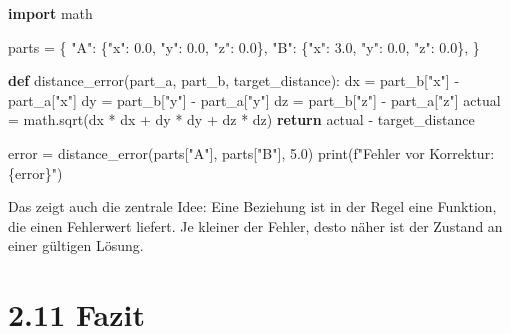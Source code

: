 \documentclass[
  12pt
]{book}
\newenvironment{Shaded}{}{}
\newcommand{\BuiltInTok}[1]{\textcolor[rgb]{0.00,0.50,0.00}{#1}}
\newcommand{\ControlFlowTok}[1]{\textcolor[rgb]{0.00,0.44,0.13}{\textbf{#1}}}
\newcommand{\FloatTok}[1]{\textcolor[rgb]{0.25,0.63,0.44}{#1}}
\newcommand{\ImportTok}[1]{\textcolor[rgb]{0.00,0.50,0.00}{\textbf{#1}}}
\newcommand{\KeywordTok}[1]{\textcolor[rgb]{0.00,0.44,0.13}{\textbf{#1}}}
\newcommand{\NormalTok}[1]{#1}
\newcommand{\OperatorTok}[1]{\textcolor[rgb]{0.40,0.40,0.40}{#1}}
\newcommand{\SpecialCharTok}[1]{\textcolor[rgb]{0.25,0.44,0.63}{#1}}
\newcommand{\SpecialStringTok}[1]{\textcolor[rgb]{0.73,0.40,0.53}{#1}}
\newcommand{\StringTok}[1]{\textcolor[rgb]{0.25,0.44,0.63}{#1}}
\begin{document}
\begin{Shaded}
\begin{Highlighting}[]
\ImportTok{import}\NormalTok{ math}

\NormalTok{parts }\OperatorTok{=}\NormalTok{ \{}
    \StringTok{"A"}\NormalTok{: \{}\StringTok{"x"}\NormalTok{: }\FloatTok{0.0}\NormalTok{, }\StringTok{"y"}\NormalTok{: }\FloatTok{0.0}\NormalTok{, }\StringTok{"z"}\NormalTok{: }\FloatTok{0.0}\NormalTok{\},}
    \StringTok{"B"}\NormalTok{: \{}\StringTok{"x"}\NormalTok{: }\FloatTok{3.0}\NormalTok{, }\StringTok{"y"}\NormalTok{: }\FloatTok{0.0}\NormalTok{, }\StringTok{"z"}\NormalTok{: }\FloatTok{0.0}\NormalTok{\},}
\NormalTok{\}}

\KeywordTok{def}\NormalTok{ distance\_error(part\_a, part\_b, target\_distance):}
\NormalTok{    dx }\OperatorTok{=}\NormalTok{ part\_b[}\StringTok{"x"}\NormalTok{] }\OperatorTok{{-}}\NormalTok{ part\_a[}\StringTok{"x"}\NormalTok{]}
\NormalTok{    dy }\OperatorTok{=}\NormalTok{ part\_b[}\StringTok{"y"}\NormalTok{] }\OperatorTok{{-}}\NormalTok{ part\_a[}\StringTok{"y"}\NormalTok{]}
\NormalTok{    dz }\OperatorTok{=}\NormalTok{ part\_b[}\StringTok{"z"}\NormalTok{] }\OperatorTok{{-}}\NormalTok{ part\_a[}\StringTok{"z"}\NormalTok{]}
\NormalTok{    actual }\OperatorTok{=}\NormalTok{ math.sqrt(dx }\OperatorTok{*}\NormalTok{ dx }\OperatorTok{+}\NormalTok{ dy }\OperatorTok{*}\NormalTok{ dy }\OperatorTok{+}\NormalTok{ dz }\OperatorTok{*}\NormalTok{ dz)}
    \ControlFlowTok{return}\NormalTok{ actual }\OperatorTok{{-}}\NormalTok{ target\_distance}

\NormalTok{error }\OperatorTok{=}\NormalTok{ distance\_error(parts[}\StringTok{"A"}\NormalTok{], parts[}\StringTok{"B"}\NormalTok{], }\FloatTok{5.0}\NormalTok{)}
\BuiltInTok{print}\NormalTok{(}\SpecialStringTok{f"Fehler vor Korrektur: }\SpecialCharTok{\{}\NormalTok{error}\SpecialCharTok{\}}\SpecialStringTok{"}\NormalTok{)}
\end{Highlighting}
\end{Shaded}

Das zeigt auch die zentrale Idee: Eine Beziehung ist in der Regel eine
Funktion, die einen Fehlerwert liefert. Je kleiner der Fehler, desto
näher ist der Zustand an einer gültigen Lösung.

\hypertarget{fazit}{%
\section{\texorpdfstring{{2.11} Fazit}{2.11 Fazit}}\label{fazit}}
\end{document}
